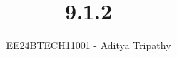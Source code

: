 \documentclass[journal]{IEEEtran}
\begin{document}

\vspace{3cm}

\title{9.1.2}
\author{EE24BTECH11001 - Aditya Tripathy}
 \maketitle
{\let\newpage\relax\maketitle}

\renewcommand{\thefigure}{\theenumi}
\renewcommand{\thetable}{\theenumi}
\setlength{\intextsep}{10pt} %


\renewcommand{\thetable}{\theenumi}
\end{document}
